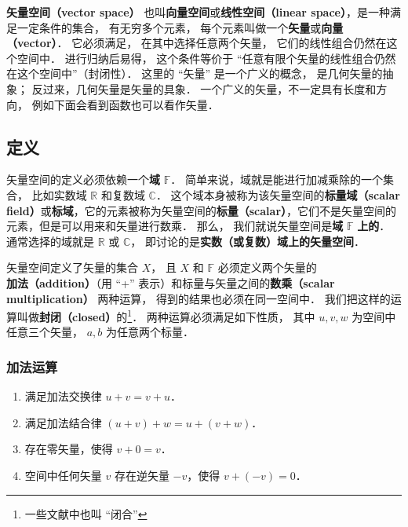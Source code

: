 

\textbf{矢量空间（vector space）} 也叫\textbf{向量空间}或\textbf{线性空间（linear space）}，是一种满足一定条件的集合， 有无穷多个元素， 每个元素叫做一个\textbf{矢量}或\textbf{向量（vector）}． 它必须满足， 在其中选择任意两个矢量， 它们的线性组合仍然在这个空间中． 进行归纳后易得， 这个条件等价于 “任意有限个矢量的线性组合仍然在这个空间中”（封闭性）． 这里的 “矢量” 是一个广义的概念， 是几何矢量的抽象； 反过来，几何矢量是矢量的具象． 一个广义的矢量，不一定具有长度和方向， 例如下面会看到函数也可以看作矢量．

\subsection{定义}
矢量空间的定义必须依赖一个\textbf{域} $\mathbb F$． 简单来说，域就是能进行加减乘除的一个集合， 比如实数域 $\mathbb R$ 和复数域 $\mathbb C$． 这个域本身被称为该矢量空间的\textbf{标量域（scalar field）}或\textbf{标域}，它的元素被称为矢量空间的\textbf{标量（scalar）}，它们不是矢量空间的元素，但是可以用来和矢量进行数乘． 那么， 我们就说矢量空间是\textbf{域} $\mathbb{F}$ \textbf{上的}． 通常选择的域就是 $\mathbb{R}$ 或 $\mathbb{C}$， 即讨论的是\textbf{实数（或复数）域上的矢量空间}．

矢量空间定义了矢量的集合 $X$， 且 $X$ 和 $\mathbb F$ 必须定义两个矢量的\textbf{加法（addition）}（用 “+” 表示）和标量与矢量之间的\textbf{数乘（scalar multiplication）} 两种运算， 得到的结果也必须在同一空间中． 我们把这样的运算叫做\textbf{封闭（closed）}的\footnote{一些文献中也叫 “闭合”}． 两种运算必须满足如下性质， 其中 $u,v,w$ 为空间中任意三个矢量， $a,b$ 为任意两个标量．

\subsubsection{加法运算}
\begin{enumerate}
\item 满足加法交换律 $u + v = v + u$．
\item 满足加法结合律 $(u + v) + w = u + (v + w)$．
\item 存在零矢量，使得 $v + 0 = v$．
\item 空间中任何矢量 $v$ 存在逆矢量 $-v$，使得 $v + (-v) = 0$．
\end{enumerate}

